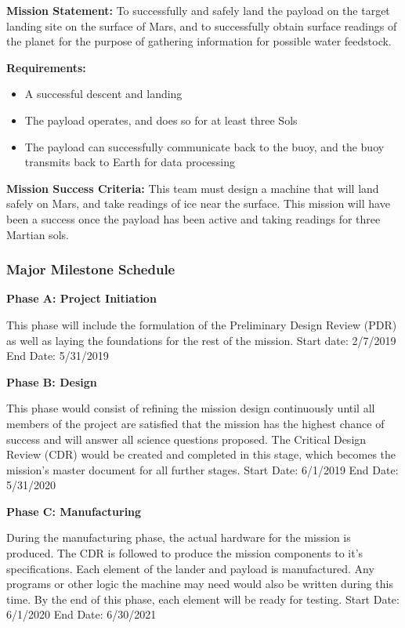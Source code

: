 \documentclass[%
 portrait,
 aapm,
 mph,%
 amsmath,amssymb,
 reprint,%
]{revtex4-2}
\begin{document}
\textbf{Mission Statement:} To successfully and safely land the payload on the target landing site on the surface of Mars, and to successfully obtain surface readings of the planet for the purpose of gathering information for possible water feedstock. 

\textbf{Requirements:} 
\begin{itemize}
	\item A successful descent and landing
	\item The payload operates, and does so for at least three Sols
	\item The payload can successfully communicate back to the buoy, and the buoy transmits back to Earth for data processing
\end{itemize}

\textbf{Mission Success Criteria:} This team must design a machine that will land safely on Mars, and take readings of ice near the surface. This mission will have been a success once the payload has been active and taking readings for three Martian sols. 

\subsubsection{Major Milestone Schedule}

\textbf{Phase A: Project Initiation}

This phase will include the formulation of the Preliminary Design Review (PDR) as well as laying the foundations for the rest of the mission. Start date: 2/7/2019  End Date: 5/31/2019

\textbf{Phase B: Design}

This phase would consist of refining the mission design continuously until all members of the project are satisfied that the mission has the highest chance of success and will answer all science questions proposed. The Critical Design Review (CDR) would be created and completed in this stage, which becomes the mission's master document for all further stages. Start Date: 6/1/2019 End Date: 5/31/2020

\textbf{Phase C: Manufacturing}

During the manufacturing phase, the actual hardware for the mission is produced. The CDR is followed to produce the mission components to it's specifications. Each element of the lander and payload is manufactured. Any programs or other logic the machine may need would also be written during this time. By the end of this phase, each element will be ready for testing. Start Date: 6/1/2020 End Date: 6/30/2021
\end{document}
